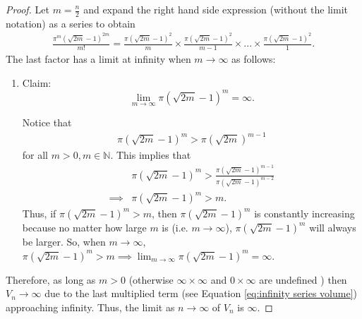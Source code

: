\begin{proof}
    \noindent
    Let $m=\frac{n}{2}$ and expand the right hand side expression (without the limit notation) as a series to obtain
    \begin{align}\label{eq:infinity series volume}
        \frac{\pi^m{\left(\sqrt{2m}-1\right)}^{2m}}{m!}=\frac{\pi(\sqrt{2m}-1)^2}{m} \times \frac{\pi(\sqrt{2m}-1)^2}{m-1} \times ... \times \frac{\pi(\sqrt{2m}-1)^2}{1}.
    \end{align}
    The last factor has a limit at infinity when $m \to \infty$ as follows:
    \begin{enumerate}
        \item Claim: $$\lim_{m\to\infty}\pi\left(\sqrt{2m}-1\right)^m=\infty.$$
        \begin{subproof}[Subproof]
            Notice that 
            \begin{align*}
                \pi\left(\sqrt{2m}-1\right)^m > \pi\left(\sqrt{2m}\right)^{m-1}
            \end{align*}
            for all $m>0, m \in \mathbb{N}$. 
            This implies that 
            \begin{align*}
                &\pi(\sqrt{2m}-1)^m > \frac{\pi(\sqrt{2m}-1)^{m-1}}{\pi(\sqrt{2m}-1)^{m-2}}\\
                \implies &\pi(\sqrt{2m}-1)^m > m.
            \end{align*}
            Thus, if $\pi(\sqrt{2m}-1)^m > m$, then $\pi(\sqrt{2m}-1)^m$ is constantly increasing because no matter how large $m$ is (i.e. $m\to\infty$), $\pi(\sqrt{2m}-1)^m$ will always be larger. So, when $m\to\infty$, $\pi(\sqrt{2m}-1)^m > m \implies \lim_{m\to\infty}\pi(\sqrt{2m}-1)^m=\infty$.
        \end{subproof}
    \end{enumerate}
    Therefore, as long as $m > 0$ (otherwise $\infty\times\infty$ and $0\times\infty$ are undefined \cite{al2008indeterminate}) then $V_n \to \infty$ due to the last multiplied term (see Equation \ref{eq:infinity series volume}) approaching infinity. Thus, the limit as $n \to \infty$ of $V_n$ is $\infty$. 
\end{proof}

